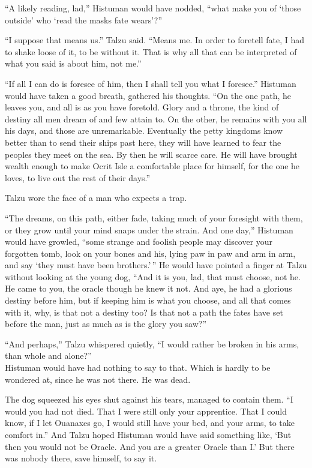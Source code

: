 ``A likely reading, lad,'' Histuman would have nodded, ``what make you of `those outside' who `read the masks fate wears'?''

``I suppose that means us.'' Talzu said. ``Means me. In order to foretell fate, I had to shake loose of it, to be without it. That is why all that can be interpreted of what you said is about him, not me.''

``If all I can do is foresee of him, then I shall tell you what I foresee.'' Histuman would have taken a good breath, gathered his thoughts. ``On the one path, he leaves you, and all is as you have foretold. Glory and a throne, the kind of destiny all men dream of and few attain to. On the other, he remains with you all his days, and those are unremarkable. Eventually the petty kingdoms know better than to send their ships past here, they will have learned to fear the peoples they meet on the sea. By then he will scarce care. He will have brought wealth enough to make Ocrit Isle a comfortable place for himself, for the one he loves, to live out the rest of their days.''

Talzu wore the face of a man who expects a trap.

``The dreams, on this path, either fade, taking much of your foresight with them, or they grow until your mind snaps under the strain. And one day,'' Histuman would have growled, ``some strange and foolish people may discover your forgotten tomb, look on your bones and his, lying paw in paw and arm in arm, and say `they must have been brothers.'\,'' He would have pointed a finger at Talzu without looking at the young dog, ``And it is you, lad, that must choose, not he. He came to you, the oracle though he knew it not. And aye, he had a glorious destiny before him, but if keeping him is what you choose, and all that comes with it, why, is that not a destiny too? Is that not a path the fates have set before the man, just as much as is the glory you saw?''

``And perhaps,'' Talzu whispered quietly, ``I would rather be broken in his arms, than whole and alone?''\\
Histuman would have had nothing to say to that. Which is hardly to be wondered at, since he was not there. He was dead.

The dog squeezed his eyes shut against his tears, managed to contain them. ``I would you had not died. That I were still only your apprentice. That I could know, if I let Ouanaxes go, I would still have your bed, and your arms, to take comfort in.'' And Talzu hoped Histuman would have said something like, `But then you would not be Oracle. And you are a greater Oracle than I.' But there was nobody there, save himself, to say it.

